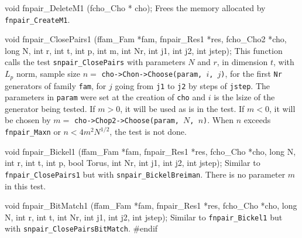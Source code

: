 void fnpair_DeleteM1 (fcho_Cho * cho);
\endcode
 \tab
  Frees the memory allocated by {\tt fnpair\_CreateM1}.
 \endtab




\code


void fnpair_ClosePairs1 (ffam_Fam *fam, fnpair_Res1 *res, fcho_Cho2 *cho,
                         long N, int r, int t, int p, int m,
                         int Nr, int j1, int j2, int jstep);
\endcode
\tab
 This function calls the test {\tt snpair\_ClosePairs}
 with parameters $N$ and $r$, in dimension $t$, with $L_p$ norm,
 sample size $n =$ {\tt cho->Chon->Choose(param, $i$, $j$)},
 for the first {\tt Nr} generators of family {\tt fam}, for $j$ going from
 {\tt j1} to {\tt j2} by steps of {\tt jstep}. The parameters in {\tt param}
 were set at the creation of {\tt cho} and $i$ is the lsize of the
 generator being tested. If $m > 0$, it will be used as is in the test.
 If  $m < 0$, it will be chosen by $m =$
  {\tt cho->Chop2->Choose(param, $N$, $n$)}.
 When $n$ exceeds {\tt fnpair\_Maxn} or $n < 4m^2 N^{1/2}$, the test
 is not done.
\endtab
\code


void fnpair_Bickel1 (ffam_Fam *fam, fnpair_Res1 *res, fcho_Cho *cho,
                     long N, int r, int t, int p, bool Torus,
                     int Nr, int j1, int j2, int jstep);
\endcode
\tab
 Similar to {\tt fnpair\_ClosePairs1} but with {\tt snpair\_BickelBreiman}.
 There is no parameter $m$ in this test.
\endtab
\code


void fnpair_BitMatch1 (ffam_Fam *fam, fnpair_Res1 *res, fcho_Cho *cho,
                       long N, int r, int t,
                       int Nr, int j1, int j2, int jstep);
\endcode
\tab
 Similar to {\tt fnpair\_Bickel1} but with
 {\tt snpair\_ClosePairsBitMatch}.
\endtab
\code
\hide
#endif
\endhide
\endcode

